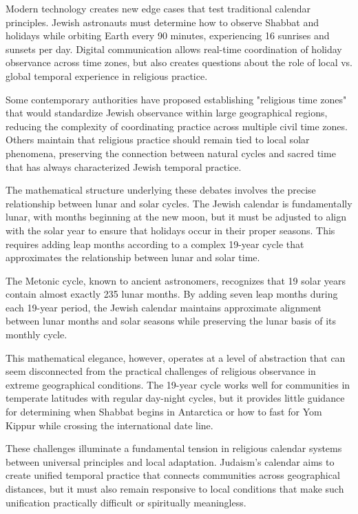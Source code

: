 Modern technology creates new edge cases that test traditional calendar principles. Jewish astronauts must determine how to observe Shabbat and holidays while orbiting Earth every 90 minutes, experiencing 16 sunrises and sunsets per day. Digital communication allows real-time coordination of holiday observance across time zones, but also creates questions about the role of local vs. global temporal experience in religious practice.

Some contemporary authorities have proposed establishing "religious time zones" that would standardize Jewish observance within large geographical regions, reducing the complexity of coordinating practice across multiple civil time zones. Others maintain that religious practice should remain tied to local solar phenomena, preserving the connection between natural cycles and sacred time that has always characterized Jewish temporal practice.

The mathematical structure underlying these debates involves the precise relationship between lunar and solar cycles. The Jewish calendar is fundamentally lunar, with months beginning at the new moon, but it must be adjusted to align with the solar year to ensure that holidays occur in their proper seasons. This requires adding leap months according to a complex 19-year cycle that approximates the relationship between lunar and solar time.

The Metonic cycle, known to ancient astronomers, recognizes that 19 solar years contain almost exactly 235 lunar months. By adding seven leap months during each 19-year period, the Jewish calendar maintains approximate alignment between lunar months and solar seasons while preserving the lunar basis of its monthly cycle.

This mathematical elegance, however, operates at a level of abstraction that can seem disconnected from the practical challenges of religious observance in extreme geographical conditions. The 19-year cycle works well for communities in temperate latitudes with regular day-night cycles, but it provides little guidance for determining when Shabbat begins in Antarctica or how to fast for Yom Kippur while crossing the international date line.

These challenges illuminate a fundamental tension in religious calendar systems between universal principles and local adaptation. Judaism's calendar aims to create unified temporal practice that connects communities across geographical distances, but it must also remain responsive to local conditions that make such unification practically difficult or spiritually meaningless.

